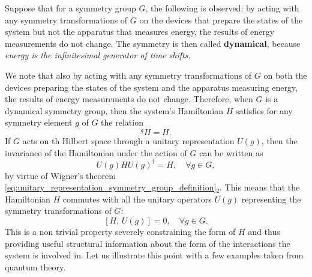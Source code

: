 Suppose that for a symmetry group \(G\), the following is observed: by acting with any symmetry transformations of \(G\) on the devices that prepare the states of the system but not the apparatus that measures energy, the results of energy measurements do not change. The symmetry is then called \textbf{dynamical}, because \textit{energy is the infinitesimal generator of time shifts}.

We note that also by acting with any symmetry transformations of \(G\) on both the devices preparing the states of the system and the apparatus measuring energy, the results of energy measurements do not change. Therefore, when \(G\) is a dynamical symmetry group, then the system’s Hamiltonian \(H\) satisfies for any symmetry element \(g\) of \(G\) the relation
\begin{equation}
    ^g H = H.
    \label{eq:dynamical_symmetry_hamiltonian_invariance_definition}
\end{equation}
If \(G\) acts on th Hilbert space through a unitary representation \(U(g)\), then the invariance of the Hamiltonian under the action of \(G\) can be written as
\begin{equation}
    U(g) H U(g)^{\dagger} = H, \quad \forall g \in G,
    \label{eq:dynamical_symmetry_hamiltonian_invariance_unitary_representation_definition}
\end{equation}
by virtue of Wigner's theorem \eqref{eq:unitary_representation_symmetry_group_definition}\(_2\). This means that the Hamiltonian \(H\) commutes with all the unitary operators \(U(g)\) representing the symmetry transformations of \(G\):
\[
    \left[ H,\, U(g) \right] = 0, \quad \forall g \in G.
\]
This is a non trivial property severely constraining the form of \(H\) and thus providing useful structural information about the form of the interactions the system is involved in. Let us illustrate this point with a few examples taken from quantum theory.

